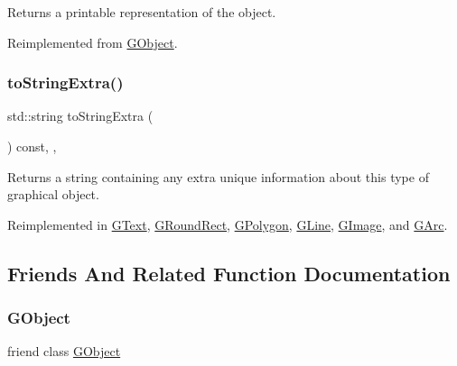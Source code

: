 Returns a printable representation of the object. 



Reimplemented from \mbox{\hyperlink{classGObject_a1fe5121d6528fdea3f243321b3fa3a49}{G\+Object}}.

\mbox{\label{classGObject_a4fcdf8de5c6de92242a975d83d8f23ea}} 
\subsubsection{\texorpdfstring{to\+String\+Extra()}{toStringExtra()}}
{\footnotesize\ttfamily std\+::string to\+String\+Extra (\begin{DoxyParamCaption}{ }\end{DoxyParamCaption}) const\hspace{0.3cm}{\ttfamily [protected]}, {\ttfamily [virtual]}, {\ttfamily [inherited]}}



Returns a string containing any extra unique information about this type of graphical object. 



Reimplemented in \mbox{\hyperlink{classGText_a85b5bcebac42ec5f130b0c3851383a23}{G\+Text}}, \mbox{\hyperlink{classGRoundRect_a85b5bcebac42ec5f130b0c3851383a23}{G\+Round\+Rect}}, \mbox{\hyperlink{classGPolygon_a4fcdf8de5c6de92242a975d83d8f23ea}{G\+Polygon}}, \mbox{\hyperlink{classGLine_a85b5bcebac42ec5f130b0c3851383a23}{G\+Line}}, \mbox{\hyperlink{classGImage_a85b5bcebac42ec5f130b0c3851383a23}{G\+Image}}, and \mbox{\hyperlink{classGArc_a85b5bcebac42ec5f130b0c3851383a23}{G\+Arc}}.



\subsection{Friends And Related Function Documentation}
\mbox{\label{classGCompound_ac45aa544268532ae1e01fee410b917bf}} 
\subsubsection{\texorpdfstring{G\+Object}{GObject}}
{\footnotesize\ttfamily friend class \mbox{\hyperlink{classGObject}{G\+Object}}\hspace{0.3cm}{\ttfamily [friend]}}



